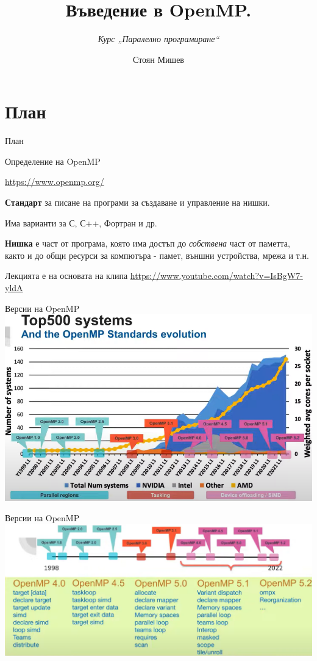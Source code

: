 \documentclass{beamer}
\title{Въведение в OpenMP.}
\subtitle{\textit{Курс „Паралелно програмиране“}}
\author{\newline \newline Стоян Мишев}
\date{} %
\begin{document}
\lstset{language=Python}
{ 
\frame{\titlepage}}


\section*{План}\begin{frame}{План}\tableofcontents\end{frame}


\begin{frame}{Определение на OpenMP}

  \url{https://www.openmp.org/}
  
  \textbf{Стандарт} за писане на програми за създаване и управление на нишки. \pause

  Има варианти за С, С++, Фортран и др. \pause

  \textbf{Нишка} е част от програма, която има достъп до \textit{собствена} част от паметта, както и до общи ресурси за компютъра - памет, външни устройства, мрежа и т.н. \pause

  Лекцията е на основата на клипа \url{https://www.youtube.com/watch?v=IsBgW7-yldA}
  
\end{frame}


\begin{frame}{Версии на OpenMP}
  \includegraphics[width=\textwidth]{openmp-standards.png}
\end{frame}

\begin{frame}{Версии на OpenMP}
  \includegraphics[width=\textwidth]{openmp-variants.png}
\end{frame}
\end{document}
